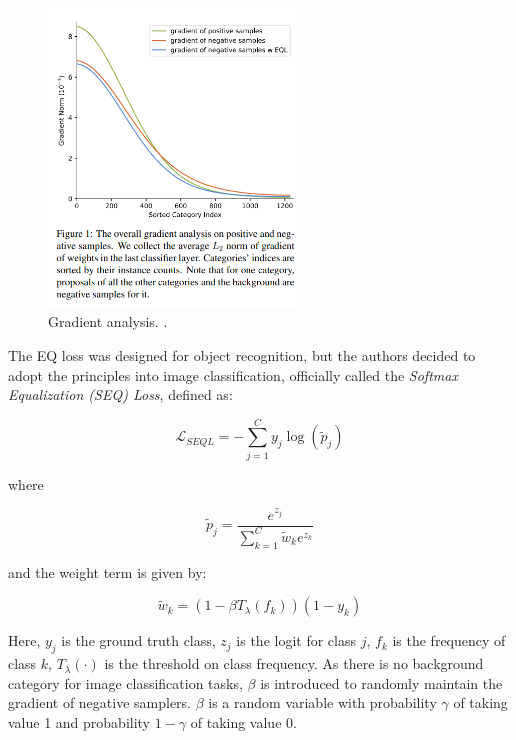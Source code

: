 \begin{figure}[ht]
    \centering
    \includegraphics[width=0.6\textwidth]{Images/gradient_analysis.png} 
    \caption{Gradient analysis. \cite{tan2020equalizationlosslongtailedobject}.}
    \label{fig:eql_gradients} 
\end{figure}

The EQ loss was designed for object recognition, but the authors decided to adopt the principles into image classification, officially called the \emph{Softmax Equalization (SEQ) Loss}, defined as: 

\begin{equation}
    \label{eq:EQ_loss}
    \mathcal{L}_{SEQL} = - \sum_{j=1}^{C} y_j \log(\tilde{p}_j)
\end{equation}

where

\begin{equation}
    \tilde{p}_j = \frac{e^{z_j}}{\sum_{k=1}^{C} \tilde{w}_k e^{z_k}}
\end{equation}

and the weight term is given by:

\begin{equation}
    \tilde{w}_k = (1 - \beta T_\lambda(f_k))(1 - y_k)
\end{equation}

Here, $y_j$ is the ground truth class, $z_j$ is the logit for class $j$, $f_k$ is the frequency of class $k$, \(T_\lambda(\cdot)\) is the threshold on class frequency. As there is no background category for image classification tasks, $\beta$ is introduced to randomly maintain the gradient of negative samplers. \(\beta\) is a random variable with probability \(\gamma\) of taking value 1 and probability \(1 - \gamma\) of taking value 0.


